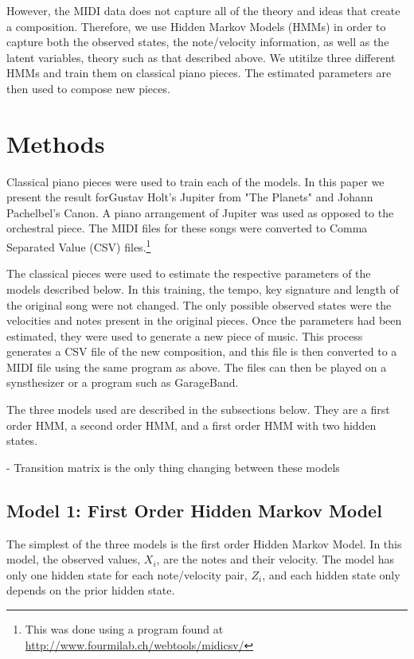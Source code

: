 \documentclass{article} %
\begin{document}
However, the MIDI data does not capture all of the theory and ideas that create a composition. Therefore, we use Hidden Markov Models (HMMs) in order to capture both the observed states, the note/velocity information, as well as the latent variables, theory such as that described above. We utitilze three different HMMs and train them on classical piano pieces. The estimated parameters are then used to compose new pieces.


\section{Methods}

Classical piano pieces were used to train each of the models. In this paper we present the result forGustav Holt's Jupiter from "The Planets" and Johann Pachelbel's Canon. A piano arrangement of Jupiter was used as opposed to the orchestral piece. The MIDI files for these songs were converted to Comma Separated Value (CSV) files.\footnote{This was done using a program found at \url{http://www.fourmilab.ch/webtools/midicsv/}} 

The classical pieces were used to estimate the respective parameters of the models described below. In this training, the tempo, key signature and length of the original song were not changed. The only possible observed states were the velocities and notes present in the original pieces. Once the parameters had been estimated, they were used to generate a new piece of music. This process generates a CSV file of the new composition, and this file is then converted to a MIDI file using the same program as above. The files can then be played on a synsthesizer or a program such as GarageBand.

The three models used are described in the subsections below. They are a first order HMM, a second order HMM, and a first order HMM with two hidden states. 

- Transition matrix is the only thing changing between these models

\subsection {Model 1: First Order Hidden Markov Model}

The simplest of the three models is the first order Hidden Markov Model. In this model, the observed values, $X_i$, are the notes and their velocity. The model has only one hidden state for each note/velocity pair, $Z_i$, and each hidden state only depends on the prior hidden state. 
\end{document}
